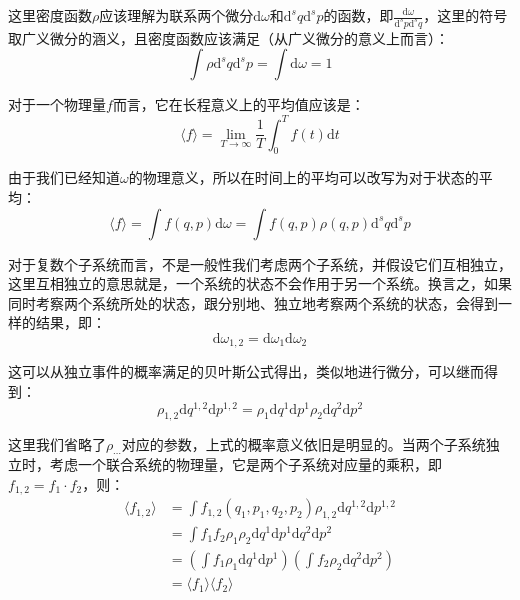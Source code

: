 \documentclass[UTF8]{ctexart}
\begin{document}
\begin{spacing}{2.0}
这里密度函数$\rho$应该理解为联系两个微分$\text{d}\omega$和$\text{d}^{s}q\text{d}^{s}p$的函数，即$\frac{\text{d}\omega}{\text{d}^{s}p\text{d}^{s}q}$，这里的符号取广义微分的涵义，且密度函数应该满足（从广义微分的意义上而言）：
\begin{equation}
\int \rho \text{d}^{s}q\text{d}^{s}p = \int \text{d}\omega = 1
\end{equation}

对于一个物理量$f$而言，它在长程意义上的平均值应该是：
\begin{equation}
\langle f \rangle = \lim_{T\rightarrow \infty}\frac{1}{T}\int_{0}^{T}f(t)\text{d}t
\end{equation}

由于我们已经知道$\omega$的物理意义，所以在时间上的平均可以改写为对于状态的平均：
\begin{equation}
\langle f \rangle = \int f(q,p) \text{d}\omega = \int f(q,p)\rho(q,p) \text{d}^{s}q \text{d}^{s}p
\end{equation}

对于复数个子系统而言，不是一般性我们考虑两个子系统，并假设它们互相独立，这里互相独立的意思就是，一个系统的状态不会作用于另一个系统。换言之，如果同时考察两个系统所处的状态，跟分别地、独立地考察两个系统的状态，会得到一样的结果，即：
\begin{equation}
\text{d}\omega_{1,2}=\text{d}\omega_{1}\text{d}\omega_{2}
\end{equation}

这可以从独立事件的概率满足的贝叶斯公式得出，类似地进行微分，可以继而得到：
\begin{equation}
\rho_{1,2}\text{d}q^{1,2}\text{d}p^{1,2}=\rho_{1}\text{d}q^{1}\text{d}p^{1}\rho_{2}\text{d}q^{2}\text{d}p^{2}
\end{equation}

这里我们省略了$\rho_{\cdots}$对应的参数，上式的概率意义依旧是明显的。当两个子系统独立时，考虑一个联合系统的物理量，它是两个子系统对应量的乘积，即$f_{1,2}=f_{1}\cdot f_{2}$，则：
\begin{equation}
\begin{aligned}
\langle f_{1,2} \rangle &= \int f_{1,2}(q_{1},p_{1},q_{2},p_{2})\rho_{1,2}\text{d}q^{1,2}\text{d}p^{1,2}\\
&=\int f_{1}f_{2}\rho_{1}\rho_{2}\text{d}q^{1}\text{d}p^{1}\text{d}q^{2}\text{d}p^{2}\\
&=(\int f_{1}\rho_{1}\text{d}q^{1}\text{d}p^{1})(\int f_{2}\rho_{2}\text{d}q^{2}\text{d}p^{2})\\
&=\langle f_{1}\rangle \langle f_{2}\rangle
\end{aligned}
\end{equation}


\end{spacing}
\end{document}
